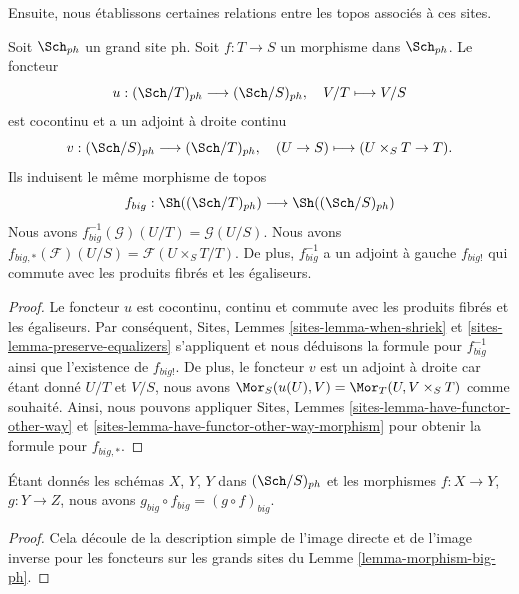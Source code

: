 \noindent
Ensuite, nous établissons certaines relations entre les topos associés à ces sites.

\begin{lemma}
\label{lemma-morphism-big-ph}
Soit $\Sch_{ph}$ un grand site ph. Soit $f : T \to S$ un morphisme dans $\Sch_{ph}$. Le foncteur
$$
u : (\Sch/T)_{ph} \longrightarrow (\Sch/S)_{ph},
\quad
V/T \longmapsto V/S
$$
est cocontinu et a un adjoint à droite continu
$$
v : (\Sch/S)_{ph} \longrightarrow (\Sch/T)_{ph},
\quad
(U \to S) \longmapsto (U \times_S T \to T).
$$
Ils induisent le même morphisme de topos
$$
f_{big} :
\Sh((\Sch/T)_{ph})
\longrightarrow
\Sh((\Sch/S)_{ph})
$$
Nous avons $f_{big}^{-1}(\mathcal{G})(U/T) = \mathcal{G}(U/S)$. Nous avons $f_{big, *}(\mathcal{F})(U/S) = \mathcal{F}(U \times_S T/T)$. De plus, $f_{big}^{-1}$ a un adjoint à gauche $f_{big!}$ qui commute avec les produits fibrés et les égaliseurs.
\end{lemma}

\begin{proof}
Le foncteur $u$ est cocontinu, continu et commute avec les produits fibrés et les égaliseurs. Par conséquent, Sites, Lemmes \ref{sites-lemma-when-shriek} et \ref{sites-lemma-preserve-equalizers} s'appliquent et nous déduisons la formule pour $f_{big}^{-1}$ ainsi que l'existence de $f_{big!}$. De plus, le foncteur $v$ est un adjoint à droite car étant donné $U/T$ et $V/S$, nous avons $\Mor_S(u(U), V) = \Mor_T(U, V \times_S T)$ comme souhaité. Ainsi, nous pouvons appliquer Sites, Lemmes \ref{sites-lemma-have-functor-other-way} et \ref{sites-lemma-have-functor-other-way-morphism} pour obtenir la formule pour $f_{big, *}$.
\end{proof}

\begin{lemma}
\label{lemma-composition-ph}
Étant donnés les schémas $X$, $Y$, $Y$ dans $(\Sch/S)_{ph}$ et les morphismes $f : X \to Y$, $g : Y \to Z$, nous avons $g_{big} \circ f_{big} = (g \circ f)_{big}$.
\end{lemma}

\begin{proof}
Cela découle de la description simple de l'image directe et de l'image inverse pour les foncteurs sur les grands sites du Lemme \ref{lemma-morphism-big-ph}.
\end{proof}



































